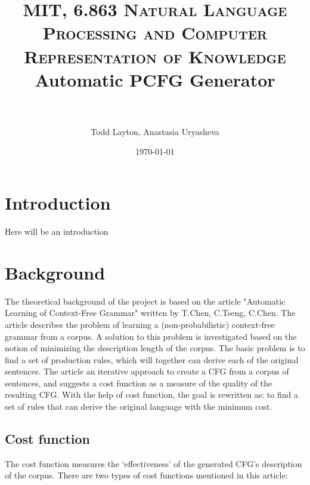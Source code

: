 \documentclass[paper=a4, fontsize=11pt]{scrartcl} %
\title{	
\normalfont \normalsize 
\textsc{MIT, 6.863 Natural Language Processing and Computer Representation of Knowledge}
\horrule{0.5pt} \\[0.4cm] %
\huge Automatic PCFG Generator \\ %
\horrule{2pt} \\[0.5cm] %
}
\author {Todd Layton, Anastasia Uryasheva}
\date{\normalsize\today}
\numberwithin{equation}{section} %
\numberwithin{figure}{section} %
\numberwithin{table}{section} %
\begin{document}
\maketitle %


\section{Introduction}

Here will be an introduction


\section{Background}

The theoretical background of the project is based on the article "Automatic Learning of Context-Free Grammar" written by T.Chen, C.Tseng, C.Chen. The article describes the problem of learning a (non-probabilistic) context-free grammar from a corpus. A solution to this problem is investigated based on the notion of minimizing the description length of the corpus. 
The basic problem is to find a set of production rules, which will together can derive each of the original sentences. The article an iterative approach to create a CFG from a corpus of sentences, and suggests a cost function as a measure of the quality of the resulting CFG. With the help of cost function, the goal is rewritten as: to find a set of rules that can derive the original language with the minimum cost.

\subsection{Cost function}

The cost function measures the `effectiveness' of the generated CFG's description of the corpus. There are two types of cost functions mentioned in this article:
\end{document}
